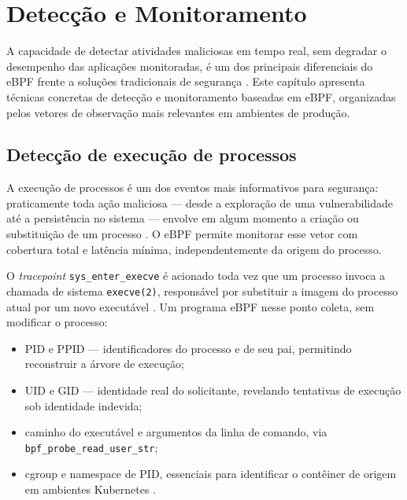 \chapter{Detecção e Monitoramento}
\label{cap:deteccao}

A capacidade de detectar atividades maliciosas em tempo real, sem degradar o
desempenho das aplicações monitoradas, é um dos principais diferenciais do eBPF
frente a soluções tradicionais de segurança \cite{cassagnes2020}.
Este capítulo apresenta técnicas concretas de detecção e monitoramento baseadas
em eBPF, organizadas pelos vetores de observação mais relevantes em ambientes de
produção.

\section{Detecção de execução de processos}

A execução de processos é um dos eventos mais informativos para segurança:
praticamente toda ação maliciosa — desde a exploração de uma vulnerabilidade até
a persistência no sistema — envolve em algum momento a criação ou substituição de
um processo \cite{gregg2019}.
O eBPF permite monitorar esse vetor com cobertura total e latência mínima,
independentemente da origem do processo.

O \textit{tracepoint} \texttt{sys\_enter\_execve} é acionado toda vez que um
processo invoca a chamada de sistema \texttt{execve(2)}, responsável por substituir
a imagem do processo atual por um novo executável \cite{linuxkernel2024}.
Um programa eBPF nesse ponto coleta, sem modificar o processo:

\begin{itemize}
  \item PID e PPID — identificadores do processo e de seu pai, permitindo
        reconstruir a árvore de execução;
  \item UID e GID — identidade real do solicitante, revelando tentativas de
        execução sob identidade indevida;
  \item caminho do executável e argumentos da linha de comando, via
        \texttt{bpf\_probe\_read\_user\_str};
  \item cgroup e namespace de PID, essenciais para identificar o contêiner de
        origem em ambientes Kubernetes \cite{cassagnes2020}.
\end{itemize}

